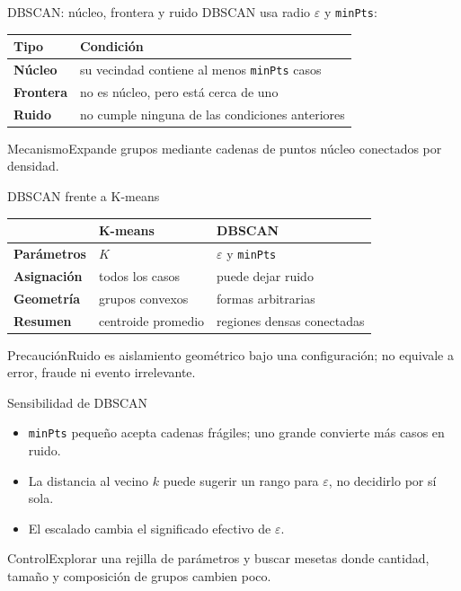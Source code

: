 \documentclass[aspectratio=169,10pt]{beamer}
\begin{document}
\begin{frame}{DBSCAN: núcleo, frontera y ruido}
  \small
  DBSCAN usa radio $\varepsilon$ y \texttt{minPts}:
  \begin{tabularx}{\textwidth}{>{\bfseries}p{}X}\toprule
  Tipo & Condición\\\midrule
  Núcleo & su vecindad contiene al menos \texttt{minPts} casos\\
  Frontera & no es núcleo, pero está cerca de uno\\
  Ruido & no cumple ninguna de las condiciones anteriores\\\bottomrule
  \end{tabularx}
  \begin{block}{Mecanismo}Expande grupos mediante cadenas de puntos núcleo conectados por densidad.\end{block}
\end{frame}

\begin{frame}{DBSCAN frente a K-means}
  \small
  \begin{tabularx}{\textwidth}{>{\bfseries}p{}XX}\toprule
   & K-means & DBSCAN\\\midrule
  Parámetros & $K$ & $\varepsilon$ y \texttt{minPts}\\
  Asignación & todos los casos & puede dejar ruido\\
  Geometría & grupos convexos & formas arbitrarias\\
  Resumen & centroide promedio & regiones densas conectadas\\\bottomrule
  \end{tabularx}
  \begin{alertblock}{Precaución}Ruido es aislamiento geométrico bajo una configuración; no equivale a error, fraude ni evento irrelevante.\end{alertblock}
\end{frame}

\begin{frame}{Sensibilidad de DBSCAN}
  \small
  \begin{itemize}
    \item \texttt{minPts} pequeño acepta cadenas frágiles; uno grande convierte más casos en ruido.
    \item La distancia al vecino $k$ puede sugerir un rango para $\varepsilon$, no decidirlo por sí sola.
    \item El escalado cambia el significado efectivo de $\varepsilon$.
  \end{itemize}
  \begin{block}{Control}Explorar una rejilla de parámetros y buscar mesetas donde cantidad, tamaño y composición de grupos cambien poco.\end{block}
\end{frame}
\end{document}
